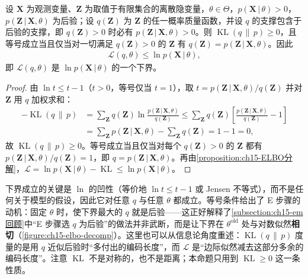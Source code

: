 \documentclass[../../main.tex]{subfiles}
\begin{document}
\begin{proposition}\label{proposition:ch15-ELBO下界}
设 $\bm{X}$ 为观测变量、$\bm{Z}$ 为取值于有限集合的离散隐变量，$\theta\in\Theta$，$p(\bm{X}\,|\,\theta)>0$，$p(\bm{Z}\,|\,\bm{X},\theta)$ 为后验；设 $q(\bm{Z})$ 为 $\bm{Z}$ 的任一概率质量函数，并设 $q$ 的支撑包含于后验的支撑，即 $q(\bm{Z})>0$ 时必有 $p(\bm{Z}\,|\,\bm{X},\theta)>0$。则 $\operatorname{KL}(q\,\|\,p)\geqslant0$，且等号成立当且仅当对一切满足 $q(\bm{Z})>0$ 的 $\bm{Z}$ 有 $q(\bm{Z})=p(\bm{Z}\,|\,\bm{X},\theta)$。因此
\begin{align*}
\mathcal{L}(q,\theta)\leqslant\ln p(\bm{X}\,|\,\theta),
\end{align*}
即 $\mathcal{L}(q,\theta)$ 是 $\ln p(\bm{X}\,|\,\theta)$ 的一个下界。
\end{proposition}
\begin{proof}
由 $\ln t\leqslant t-1$（$t>0$，等号仅当 $t=1$），取 $t=p(\bm{Z}\,|\,\bm{X},\theta)/q(\bm{Z})$ 并对 $\bm{Z}$ 用 $q$ 加权求和：
\begin{align*}
-\operatorname{KL}(q\,\|\,p)
&=\sum_{\bm{Z}}q(\bm{Z})\ln\frac{p(\bm{Z}\,|\,\bm{X},\theta)}{q(\bm{Z})}
\leqslant\sum_{\bm{Z}}q(\bm{Z})\left[\frac{p(\bm{Z}\,|\,\bm{X},\theta)}{q(\bm{Z})}-1\right]\\
&=\sum_{\bm{Z}}p(\bm{Z}\,|\,\bm{X},\theta)-\sum_{\bm{Z}}q(\bm{Z})=1-1=0,
\end{align*}
故 $\operatorname{KL}(q\,\|\,p)\geqslant0$。等号成立当且仅当对每个 $q(\bm{Z})>0$ 的 $\bm{Z}$ 都有 $p(\bm{Z}\,|\,\bm{X},\theta)/q(\bm{Z})=1$，即 $q=p(\bm{Z}\,|\,\bm{X},\theta)$。再由\cref{proposition:ch15-ELBO分解}，$\mathcal{L}=\ln p(\bm{X}\,|\,\theta)-\operatorname{KL}\leqslant\ln p(\bm{X}\,|\,\theta)$。
\end{proof}

\begin{remark}
下界成立的关键是 $\ln$ 的凹性（等价地 $\ln t\leqslant t-1$ 或 Jensen 不等式），而不是任何关于模型的假设，因此它对任意 $q$ 与任意 $\theta$ 都成立。等号条件给出了 E 步骤的动机：固定 $\theta$ 时，使下界最大的 $q$ 就是后验——这正好解释了\cref{subsection:ch15-em回顾}中“E 步骤选 $q$ 为后验”的做法并非武断，而是让下界在 $\theta^{\text{old}}$ 处与对数似然\textbf{相切}（\cref{figure:ch15-elbo-decomp}）。这里也可以从信息论角度重述：$\operatorname{KL}(q\,\|\,p)$ 度量的是用 $q$ 近似后验时“多付出的编码长度”，而 $\mathcal{L}$ 是“边际似然减去这部分多余的编码长度”。注意 $\operatorname{KL}$ 不是对称的，也不是距离；本命题只用到 $\operatorname{KL}\geqslant0$ 这一条性质。
\end{remark}
\end{document}
